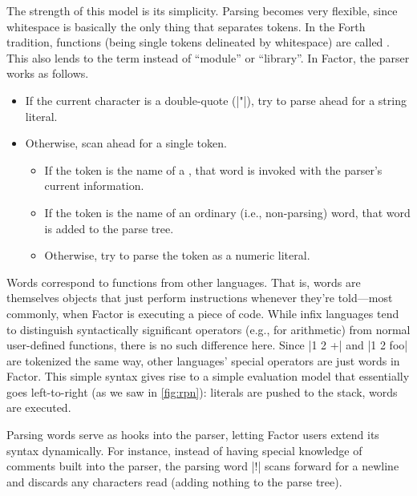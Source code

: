 The strength of this model is its simplicity.  Parsing becomes very flexible,
since whitespace is basically the only thing that separates tokens.  In the
Forth tradition, functions (being single tokens delineated by whitespace) are
called .  This also lends to the term  instead of
``module'' or ``library''.   In Factor, the parser works as follows.
\begin{itemize}
  \item If the current character is a double-quote (\factor|"|), try to
        parse ahead for a string literal.
  \item Otherwise, scan ahead for a single token.
        \begin{itemize}
          \item If the token is the name of a , that word is
                invoked with the parser's current information.
          \item If the token is the name of an ordinary (i.e., non-parsing)
                word, that word is added to the parse tree.
          \item Otherwise, try to parse the token as a numeric literal.
        \end{itemize}
\end{itemize}

Words correspond to  functions from other languages.  That
is, words are themselves objects that just perform instructions whenever
they're told---most commonly, when Factor is executing a piece of code.  While
infix languages tend to distinguish syntactically significant operators (e.g.,
for arithmetic) from normal user-defined functions, there is no such difference
here.  Since \factor|1 2 +| and \factor|1 2 foo| are tokenized the same
way, other languages' special operators are just words in Factor.  This simple
syntax gives rise to a simple evaluation model that essentially goes
left-to-right (as we saw in \vref{fig:rpn}): literals are pushed to the stack,
words are executed.


Parsing words serve as hooks into the parser, letting Factor users extend its
syntax dynamically.  For instance, instead of having special knowledge of
comments built into the parser, the parsing word \factor|!| scans forward
for a newline and discards any characters read (adding nothing to the parse
tree).

